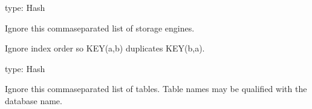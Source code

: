 \documentclass[letterpaper,10pt,english]{sphinxmanual}
\begin{document}
\begin{fulllineitems}
\label{\detokenize{mariadb-index-checker:cmdoption-mariadb-index-checker-ignore-engines}}
type: Hash

Ignore this comma\sphinxhyphen{}separated list of storage engines.

\end{fulllineitems}


\begin{fulllineitems}
\label{\detokenize{mariadb-index-checker:cmdoption-mariadb-index-checker-ignore-order}}
Ignore index order so KEY(a,b) duplicates KEY(b,a).

\end{fulllineitems}


\begin{fulllineitems}
\label{\detokenize{mariadb-index-checker:cmdoption-mariadb-index-checker-ignore-tables}}
type: Hash

Ignore this comma\sphinxhyphen{}separated list of tables.  Table names may be qualified with
the database name.

\end{fulllineitems}
\end{document}
